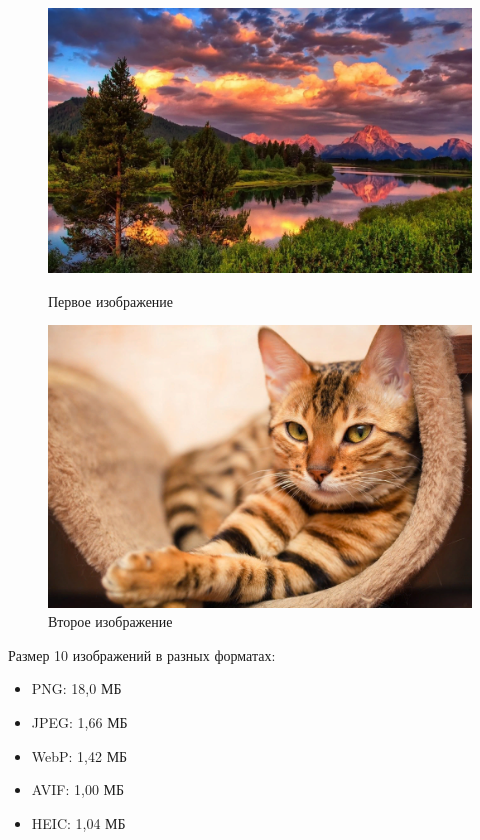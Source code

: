 \documentclass[12pt]{article}
\begin{document}
\begin{figure}[H]
    \centering
    \begin{minipage}{0.48\textwidth}
        \centering
        \includegraphics[width=\linewidth]{../images/image_comp/image1.png}
        \caption{Первое изображение}
        \label{fig:image1}
    \end{minipage}
    \hfill
    \begin{minipage}{0.48\textwidth}
        \centering
        \includegraphics[width=\linewidth]{../images/image_comp/image4.png}
        \caption{Второе изображение}
        \label{fig:image2}
    \end{minipage}
\end{figure}

Размер 10 изображений в разных форматах:

\begin{itemize}[label=-]
    \item PNG: 18,0 МБ
    \item JPEG: 1,66 МБ
    \item WebP: 1,42 МБ
    \item AVIF: 1,00 МБ
    \item HEIC: 1,04 МБ
\end{itemize}
\end{document}

